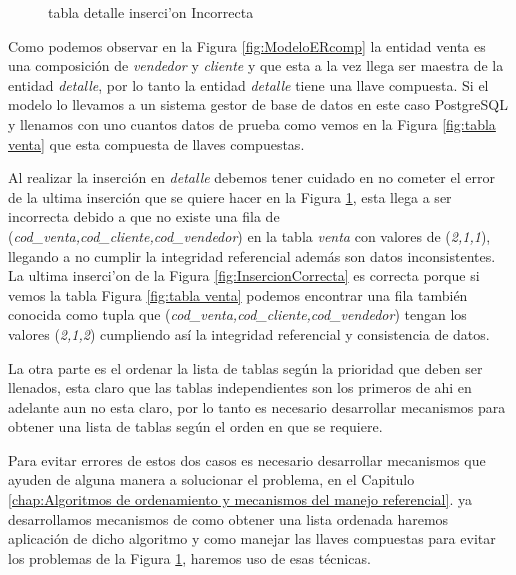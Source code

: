 \begin{figure}[H]
\centering
{}
\caption{tabla detalle inserci'on Incorrecta} \label{fig:InsercionIncorrecta}
\end{figure}
Como podemos observar en la Figura \ref{fig:ModeloERcomp} la entidad venta es una composici\'on de \textit{vendedor} y \textit{cliente} y que esta a la vez llega ser maestra de la entidad \textit{detalle}, por lo tanto la entidad \textit{detalle} tiene una llave compuesta. Si el modelo lo llevamos a un sistema gestor de base de datos en este caso PostgreSQL y llenamos con uno cuantos datos de prueba como vemos en la Figura \ref{fig:tabla venta} que esta compuesta de llaves compuestas.

Al realizar la inserci\'on en \textit{detalle} debemos tener cuidado en no cometer el error de la ultima inserci\'on que se quiere hacer en la Figura \ref{fig:InsercionIncorrecta}, esta llega a ser incorrecta debido a que no existe una fila de (\textit{cod\_venta,cod\_cliente,cod\_vendedor}) en la tabla \textit{venta} con valores de (\textit{2,1,1}), llegando a no cumplir la integridad referencial adem\'as son datos inconsistentes. La ultima inserci'on de la Figura \ref{fig:InsercionCorrecta} es correcta porque si vemos la tabla Figura \ref{fig:tabla venta} podemos encontrar una fila tambi\'en conocida como tupla que (\textit{cod\_venta,cod\_cliente,cod\_vendedor}) tengan los valores (\textit{2,1,2}) cumpliendo as\'i la integridad referencial y consistencia de datos.
  
  
La otra parte es el ordenar la lista de tablas seg\'un la prioridad que deben ser llenados, esta claro que las tablas independientes son los primeros de ahi en adelante aun no esta claro, por lo tanto es necesario desarrollar mecanismos para obtener una lista de tablas seg\'un el orden en que se requiere.

Para evitar errores de estos dos casos es necesario desarrollar mecanismos que ayuden de alguna manera a solucionar el problema, en el Capitulo \ref{chap:Algoritmos de ordenamiento y mecanismos del manejo referencial}. ya desarrollamos mecanismos de como obtener una lista ordenada haremos aplicaci\'on de dicho algoritmo y como manejar las llaves compuestas para evitar los problemas de la Figura \ref{fig:InsercionIncorrecta}, haremos uso de esas t\'ecnicas.
